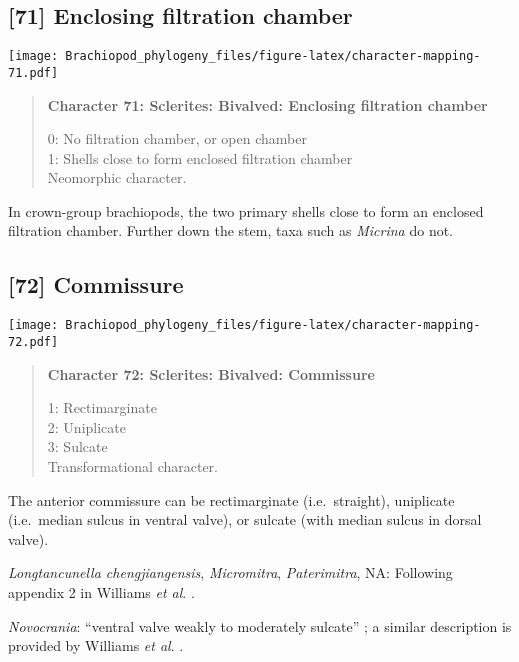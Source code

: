\documentclass[openany]{book}
\theoremstyle{definition}
\theoremstyle{definition}
\theoremstyle{definition}
\theoremstyle{remark}
\begin{document}
\subsection*{{[}71{]} Enclosing filtration
chamber}\label{enclosing-filtration-chamber}

\texttt{[image: Brachiopod\_phylogeny\_files/figure-latex/character-mapping-71.pdf]}

\begin{quote}
\textbf{Character 71: Sclerites: Bivalved: Enclosing filtration chamber}

0: No filtration chamber, or open chamber\\
1: Shells close to form enclosed filtration chamber\\
Neomorphic character.
\end{quote}

In crown-group brachiopods, the two primary shells close to form an
enclosed filtration chamber. Further down the stem, taxa such as
\emph{Micrina} do not.

\subsection*{{[}72{]} Commissure}\label{commissure}

\texttt{[image: Brachiopod\_phylogeny\_files/figure-latex/character-mapping-72.pdf]}

\begin{quote}
\textbf{Character 72: Sclerites: Bivalved: Commissure}

1: Rectimarginate\\
2: Uniplicate\\
3: Sulcate\\
Transformational character.
\end{quote}

The anterior commissure can be rectimarginate (i.e.~straight),
uniplicate (i.e.~median sulcus in ventral valve), or sulcate (with
median sulcus in dorsal valve).

\hypertarget{Longtancunella_chengjiangensis-coding-72}{}
\emph{Longtancunella chengjiangensis}, \emph{Micromitra},
\emph{Paterimitra}, NA: Following appendix 2 in Williams \emph{et al}.
\citeyearpar{Williams1998Thediversity}.

\hypertarget{Novocrania-coding-72}{}
\emph{Novocrania}: ``ventral valve weakly to moderately sulcate''
\citep{Topper2013Theoldest}; a similar description is provided by
Williams \emph{et al}.
\citeyearpar{Williams2000LinguliformeaCraniiformea}.
\end{document}
